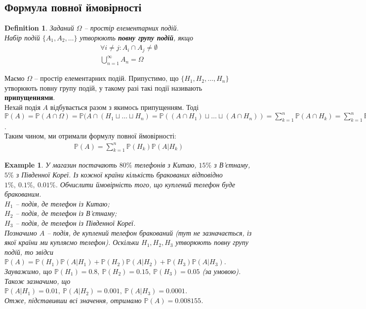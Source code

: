 \documentclass[a4paper, 10pt]{article}
\theoremstyle{theoremdd}
\newtheorem{definition}[theorem]{Definition}
\newtheorem{example}[theorem]{Example}
\begin{document}
\subsection{Формула повної ймовірності}
\begin{definition}
Заданий $\Omega$ -- простір елементарних подій.\\
Набір подій $\{A_1,A_2,\dots\}$ утворюють \textbf{повну групу подій}, якщо
\begin{align*}
\forall i \neq j: A_i \cap A_j \neq \emptyset \\
\bigcup_{n=1}^\infty A_n = \Omega
\end{align*} 
\end{definition}
\noindent
Маємо $\Omega$ -- простір елементарних подій. Припустимо, що $\{H_1,H_2,\dots,H_n\}$ утворюють повну групу подій, у такому разі такі події називають \textbf{припущеннями}.\\
Нехай подія $A$ відбувається разом з якимось припущенням. Тоді\\
$\displaystyle \mathbb{P}(A) = \mathbb{P}\left(A \cap \Omega\right) = \mathbb{P}( A \cap (H_1 \sqcup \dots \sqcup H_n) = \mathbb{P}((A \cap H_1) \sqcup \dots \sqcup (A \cap H_n)) = \sum_{k=1}^n \mathbb{P}(A \cap H_k) = \sum_{k=1}^n \mathbb{P}(H_k) \mathbb{P}(A|H_k)$.\\
Таким чином, ми отримали формулу повної ймовірності:
\begin{align*}
\mathbb{P}(A) = \sum_{k=1}^n \mathbb{P}(H_k) \mathbb{P}(A|H_k)
\end{align*}

\begin{example}
У магазин постачають $80\%$ телефонів з Китаю, $15\%$ з В'єтнаму, $5\%$ з Південної Кореї. Із кожної країни кількість бракованих відповідно $1\% ,\ 0.1\% ,\ 0.01\%$. Обчислити ймовірність того, що куплений телефон буде бракованим.\\
$H_1$ -- подія, де телефон із Китаю;\\
$H_2$ -- подія, де телефон із В'єтнаму;\\
$H_3$ -- подія, де телефон із Південної Кореї.\\
Позначимо $A$ -- подія, де куплений телефон бракований (тут не зазначається, із якої країни ми купляємо телефон). Оскільки $H_1,H_2,H_3$ утворюють повну групу подій, то звідси\\
$\mathbb{P}(A) = \mathbb{P}(H_1) \mathbb{P}(A|H_1) + \mathbb{P}(H_2) \mathbb{P}(A|H_2) + \mathbb{P}(H_3) \mathbb{P}(A|H_3)$.\\
Зауважимо, що $\mathbb{P}(H_1) = 0.8,\ \mathbb{P}(H_2) = 0.15,\ \mathbb{P}(H_3) = 0.05$ (за умовою).\\
Також зазначимо, що $\mathbb{P}(A|H_1) = 0.01,\ \mathbb{P}(A|H_2) = 0.001,\ \mathbb{P}(A|H_3) = 0.0001$.\\
Отже, підставивши всі значення, отримамо $\mathbb{P}(A) = 0.008155$.
\end{example}
\end{document}
